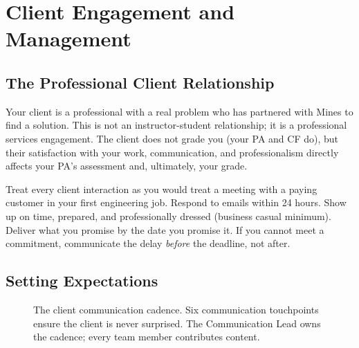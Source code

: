 \chapter{Client Engagement and Management}

\section{The Professional Client Relationship}
Your client is a professional with a real problem who has partnered with Mines to find a solution. This is not an instructor-student relationship; it is a professional services engagement. The client does not grade you (your PA and CF do), but their satisfaction with your work, communication, and professionalism directly affects your PA's assessment and, ultimately, your grade.

Treat every client interaction as you would treat a meeting with a paying customer in your first engineering job. Respond to emails within 24 hours. Show up on time, prepared, and professionally dressed (business casual minimum). Deliver what you promise by the date you promise it. If you cannot meet a commitment, communicate the delay \emph{before} the deadline, not after.

\section{Setting Expectations}

\begin{figure}[htbp]
\centering
{}
\caption{The client communication cadence. Six communication touchpoints ensure the client is never surprised. The Communication Lead owns the cadence; every team member contributes content.}\label{fig:comm-cadence}
\end{figure}


